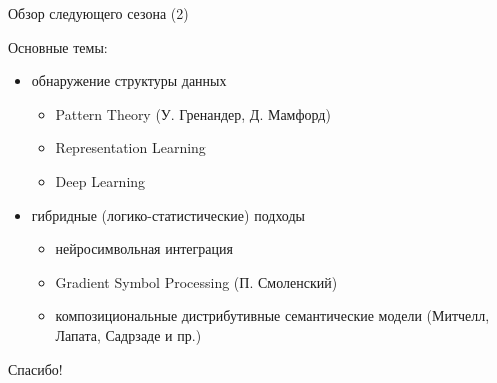 \documentclass{beamer}
\begin{document}
\begin{frame}{Обзор следующего сезона (2)}
\begin{small}
Основные темы:\\
\medskip
\begin{itemize}
	\item обнаружение структуры данных
	\begin{itemize}
    	\item Pattern Theory (У. Гренандер, Д. Мамфорд)
	    \item Representation Learning
	    \item Deep Learning
	\end{itemize}
	\item гибридные (логико-статистические) подходы
	\begin{itemize}
    	\item нейросимвольная интеграция
	    \item Gradient Symbol Processing (П. Смоленский)
	    \item композициональные дистрибутивные семантические модели (Митчелл, Лапата, Садрзаде и пр.)
	\end{itemize}
\end{itemize}
\end{small}
\end{frame}



\begin{frame}{}
    \thispagestyle{empty}
    \begin{center}
        {\large Спасибо!}
    \end{center}
\end{frame}


\end{document}

